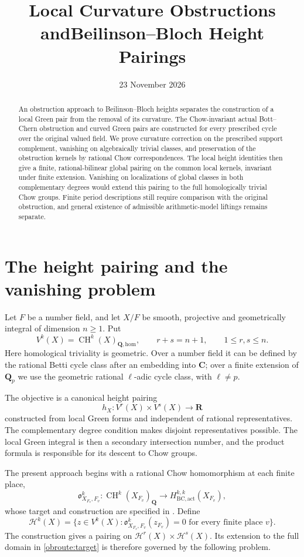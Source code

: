\documentclass[11pt,a4paper]{article}
\title{Local Curvature Obstructions and\newline Beilinson--Bloch Height Pairings}
\author{}
\date{23 November 2026}
\theoremstyle{definition}
\numberwithin{equation}{section}
\newcommand{\CH}{\operatorname{CH}}
\newcommand{\Ob}{\mathfrak o}
\newcommand{\homol}{\mathrm{hom}}
\newcommand{\Q}{\mathbf Q}
\newcommand{\R}{\mathbf R}
\begin{document}
\maketitle
\begin{abstract}
An obstruction approach to Beilinson--Bloch heights separates the construction of a local Green pair from the removal of its curvature. The Chow-invariant actual Bott--Chern obstruction and curved Green pairs are constructed for every prescribed cycle over the original valued field. We prove curvature correction on the prescribed support complement, vanishing on algebraically trivial classes, and preservation of the obstruction kernels by rational Chow correspondences. The local height identities then give a finite, rational-bilinear global pairing on the common local kernels, invariant under finite extension. Vanishing on localizations of global classes in both complementary degrees would extend this pairing to the full homologically trivial Chow groups. Finite period descriptions still require comparison with the original obstruction, and general existence of admissible arithmetic-model liftings remains separate.
\end{abstract}
\tableofcontents

\section{The height pairing and the vanishing problem}\label{obroute:introduction}

Let $F$ be a number field, and let $X/F$ be smooth, projective and geometrically integral of dimension $n\ge1$. Put
\[
 V^k(X)=\CH^k(X)_{\Q,\homol},\qquad r+s=n+1,
 \qquad 1\le r,s\le n.
\]
Here homological triviality is geometric. Over a number field it can be defined by the rational Betti cycle class after an embedding into $\mathbf C$; over a finite extension of $\Q_p$ we use the geometric rational $\ell$-adic cycle class, with $\ell\ne p$.

The objective is a canonical height pairing
\begin{equation}\label{obroute:target}
 h_X:V^r(X)\times V^s(X)\longrightarrow\R
\end{equation}
constructed from local Green forms and independent of rational representatives. The complementary degree condition makes disjoint representatives possible. The local Green integral is then a secondary intersection number, and the product formula is responsible for its descent to Chow groups.

The present approach begins with a rational Chow homomorphism at each finite place,
\[
 \Ob^k_{X_{F_v},F_v}:\CH^k(X_{F_v})_\Q
       \longrightarrow H^{k,k}_{\mathrm{BC,act}}(X_{F_v}),
\]
whose target and construction are specified in . Define
\begin{equation}\label{obroute:kernel}
 \mathcal H^k(X)=
 \{z\in V^k(X):\Ob^k_{X_{F_v},F_v}(z_{F_v})=0
                   \text{ for every finite place }v\}.
\end{equation}
The construction gives a pairing on $\mathcal H^r(X)\times\mathcal H^s(X)$. Its extension to the full domain in \eqref{obroute:target} is therefore governed by the following problem.
\end{document}
